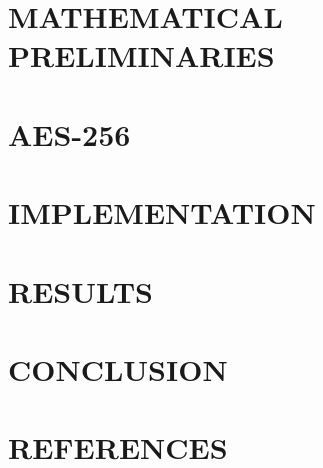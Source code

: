 \documentclass[a4paper, 10pt]{paper}
\begin{document}
\begin{multicols}{2}
        \section{MATHEMATICAL PRELIMINARIES}

        \section{AES-256}

        \section{IMPLEMENTATION}

        \section{RESULTS}

        \section{CONCLUSION}

        \section*{REFERENCES}

    \end{multicols}
\end{document}
